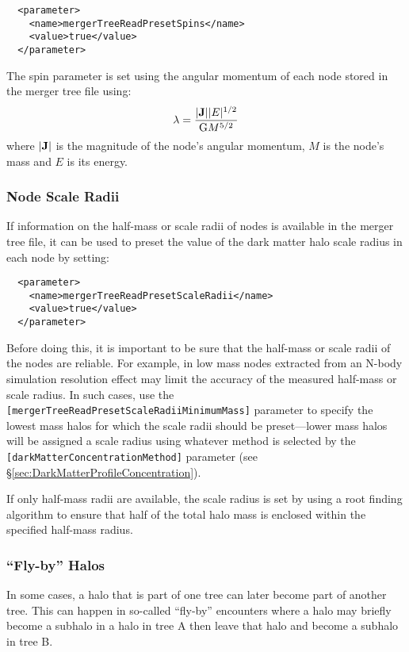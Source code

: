 \begin{verbatim}
  <parameter>
    <name>mergerTreeReadPresetSpins</name>
    <value>true</value>
  </parameter>
\end{verbatim}

The spin parameter is set using the angular momentum of each node stored in the merger tree file using:
\begin{equation}
 \lambda = {|{\bf J}| |E|^{1/2} \over {\rm G} M^{5/2}}
\end{equation}
where $|{\bf J}|$ is the magnitude of the node's angular momentum, $M$ is the node's mass and $E$ is its energy.

\subsubsection{Node Scale Radii}

If information on the half-mass or scale radii of nodes is available in the merger tree file, it can be used to preset the value of the dark matter halo scale radius in each node by setting:

\begin{verbatim}
  <parameter>
    <name>mergerTreeReadPresetScaleRadii</name>
    <value>true</value>
  </parameter>
\end{verbatim}

Before doing this, it is important to be sure that the half-mass or scale radii of the nodes are reliable. For example, in low mass nodes extracted from an N-body simulation resolution effect may limit the accuracy of the measured half-mass or scale radius. In such cases, use the {\tt [mergerTreeReadPresetScaleRadiiMinimumMass]} parameter to specify the lowest mass halos for which the scale radii should be preset---lower mass halos will be assigned a scale radius using whatever method is selected by the {\tt [darkMatterConcentrationMethod]} parameter (see \S\ref{sec:DarkMatterProfileConcentration}).

If only half-mass radii are available, the scale radius is set by using a root finding algorithm to ensure that half of the total halo mass is enclosed within the specified half-mass radius.

\subsubsection{``Fly-by'' Halos}

In some cases, a halo that is part of one tree can later become part of another tree. This can happen in so-called ``fly-by'' encounters where a halo may briefly become a subhalo in a halo in tree A then leave that halo and become a subhalo in tree B.

